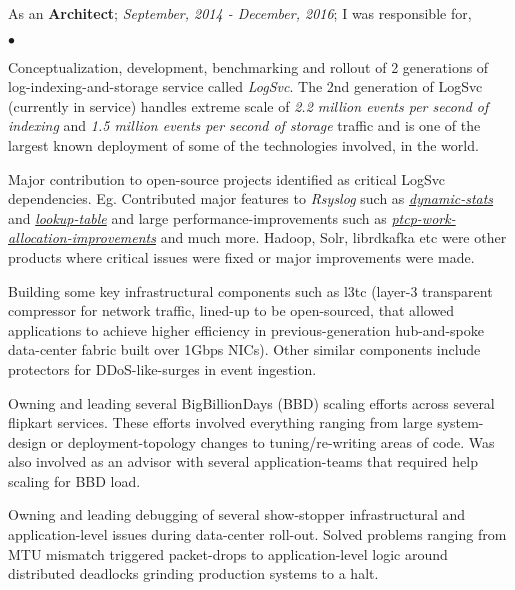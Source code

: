 \documentclass[margin,line]{res}
\newenvironment{list2}{
  \begin{list}{$\bullet$}{%
      \setlength{\itemsep}{0in}
      \setlength{\parsep}{0in} \setlength{\parskip}{0in}
      \setlength{\topsep}{0in} \setlength{\partopsep}{0in} 
      \setlength{\leftmargin}{0.2in}}}{\end{list}}
\begin{document}
\begin{resume}
As an {\bf Architect}; {\em September, 2014 - December, 2016}; I was responsible for,\\
\begin{list2}
\item Conceptualization, development, benchmarking and rollout of 2 generations of log-indexing-and-storage service called {\em LogSvc}. The 2nd generation of LogSvc (currently in service) handles extreme scale of {\em 2.2 million events per second of indexing} and {\em 1.5 million events per second of storage} traffic and is one of the largest known deployment of some of the technologies involved, in the world.
\item Major contribution to open-source projects identified as critical LogSvc dependencies. Eg. Contributed major features to {\em Rsyslog} such as \href{https://github.com/rsyslog/rsyslog/pull/614}{\em dynamic-stats} and \href{https://github.com/rsyslog/rsyslog/pull/578}{\em lookup-table} and large performance-improvements such as \href{https://github.com/rsyslog/rsyslog/pull/567}{\em ptcp-work-allocation-improvements} and much more. Hadoop, Solr, librdkafka etc were other products where critical issues were fixed or major improvements were made.
\item Building some key infrastructural components such as l3tc (layer-3 transparent compressor for network traffic, lined-up to be open-sourced, that allowed applications to achieve higher efficiency in previous-generation hub-and-spoke data-center fabric built over 1Gbps NICs). Other similar components include protectors for DDoS-like-surges in event ingestion.
\item Owning and leading several BigBillionDays (BBD) scaling efforts across several flipkart services. These efforts involved everything ranging from large system-design or deployment-topology changes to tuning/re-writing areas of code. Was also involved as an advisor with several application-teams that required help scaling for BBD load.
\item Owning and leading debugging of several show-stopper infrastructural and application-level issues during data-center roll-out. Solved problems ranging from MTU mismatch triggered packet-drops to application-level logic around distributed deadlocks grinding production systems to a halt.
\end{list2}


\end{resume}
\end{document}
